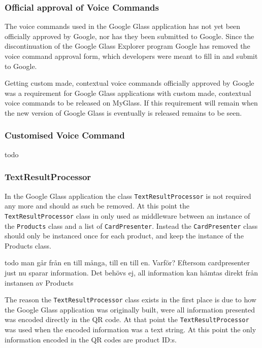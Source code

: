 \subsubsection{Official approval of Voice Commands}
The voice commands used in the Google Glass application has not yet been officially approved by Google, nor has they been submitted to Google. Since the discontinuation of the Google Glass Explorer program Google has removed the voice command approval form, which developers were meant to fill in and submit to Google.

Getting custom made, contextual voice commands officially approved by Google was a requirement for Google Glass applications with custom made, contextual voice commands to be released on MyGlass. If this requirement will remain when the new version of Google Glass is eventually is released remains to be seen.

\subsubsection{Customised Voice Command}


todo
\subsubsection{TextResultProcessor}
In the Google Glass application the class \texttt{TextResultProcessor} is not required any more and should as such be removed. At this point the \texttt{TextResultProcessor} class in only used as middleware between an instance of the \texttt{Products} class and a list of \texttt{CardPresenter}. Instead the \texttt{CardPresenter} class should only be instanced once for each product, and keep the instance of the Products class.

todo man går från en till många, till en till en. Varför? Eftersom cardpresenter just nu sparar information. Det behövs ej, all information kan hämtas direkt från instansen av Products

The reason the \texttt{TextResultProcessor} class exists in the first place is due to how the Google Glass application was originally built, were all information presented was encoded directly in the QR code. At that point the \texttt{TextResultProcessor} was used when the encoded information was a text string. At this point the only information encoded in the QR codes are product ID:s.

